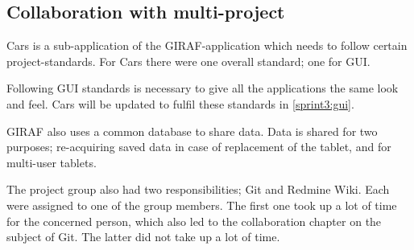 \subsection{Collaboration with multi-project}
Cars is a sub-application of the GIRAF-application which needs to follow certain project-standards.
For Cars there were one overall standard; one for GUI.

Following GUI standards is necessary to give all the applications the same look and feel.
Cars will be updated to fulfil these standards in \cref{sprint3:gui}.

GIRAF also uses a common database to share data.
Data is shared for two purposes; re-acquiring saved data in case of replacement of the tablet, and for multi-user tablets.

The project group also had two responsibilities; Git and Redmine Wiki.
Each were assigned to one of the group members.
The first one took up a lot of time for the concerned person, which also led to the collaboration chapter on the subject of Git.
The latter did not take up a lot of time.
